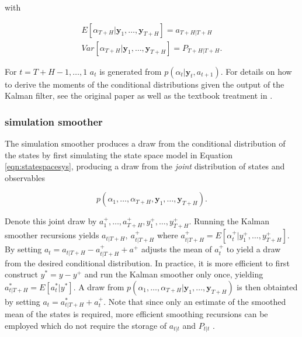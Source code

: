 \documentclass[notitlepage,a4paper,12pt]{article}
\begin{document}
\noindent with

\begin{align*}
    E[\alpha_{T+H}|\mathbf{y}_1, \dots, \mathbf{y}_{T+H}] = a_{T+H|T+H} \\
    Var[\alpha_{T+H}|\mathbf{y}_1, \dots, \mathbf{y}_{T+H}] = P_{T+H|T+H}.
\end{align*}

 For $t=T+H-1, \dots, 1$ $a_t$ is generated from $p(\alpha_{t}|\mathbf{y}_t, a_{t+1})$. For details on how to derive the moments of the conditional distributions given the output of the Kalman filter, see the original paper as well as the textbook treatment in \citet{KimNelson1999mit}.

 \subsubsection{\citet{durbinkoopman2002_biomtr} simulation smoother}

The \citet{durbinkoopman2002_biomtr} simulation smoother produces a draw from the conditional distribution of the states by first simulating the state space model in Equation \ref{eqn:statespacesys}, producing a draw from the \textit{joint} distribution of states and observables

$$p(\alpha_{1}, \dots, \alpha_{T+H}, \mathbf{y}_1, \dots, \mathbf{y}_{T+H}).$$

Denote this joint draw by $a^+_1, \dots, a^+_{T+H}, y^+_1, \dots, y^+_{T+H}$. Running the Kalman smoother recursions yields $a_{t|T+H}, \: a^+_{t|T+H}$ where $a^+_{t|T+H} = E[\alpha^+_t|y^+_1, \dots, y^+_{T+H}]$.  By setting $a_t = a_{t|T+H} - a^+_{t|T+H} + a^+$ adjusts the mean of $a^+_t$ to yield a draw from the desired conditional distribution. In practice, it is more efficient to first construct $y^* = y-y^+$ and run the Kalman smoother only once, yielding $a^*_{t|T+H} = E[a^*_t|y^*]$. A draw from $p(\alpha_{1}, \dots, \alpha_{T+H}|\mathbf{y}_1, \dots, \mathbf{y}_{T+H})$ is then obtainted by setting $a_t = a^*_{t|T+H} + a^+_t$. Note that since only an estimate of the smoothed mean of the states is required, more efficient smoothing recursions can be employed which do not require the storage of $a_{t|t}$ and $P_{t|t}$ \citep[see][ch. 4.4.2]{durbinkoopman2002_biomtr}.
\end{document}

